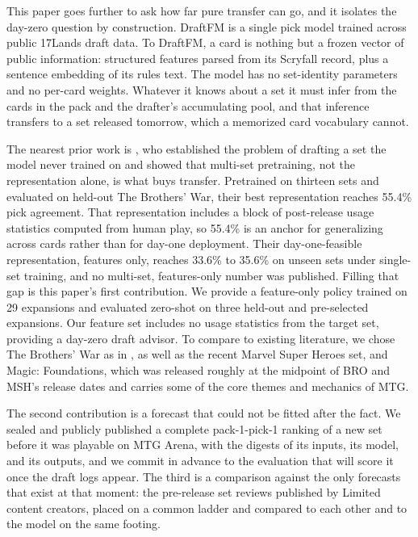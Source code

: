 \documentclass[11pt]{article}
\numberwithin{equation}{section}
\begin{document}
This paper goes further to ask how far pure transfer can go, and it isolates the day-zero
question by construction. DraftFM is a single pick model trained across public
17Lands draft data. To DraftFM, a card is nothing but a frozen vector of public
information: structured features parsed from its Scryfall record, plus a sentence
embedding of its rules text. The model has no set-identity parameters and no
per-card weights. Whatever it knows about a set it must infer from the cards in
the pack and the drafter's accumulating pool, and that inference transfers to a
set released tomorrow, which a memorized card vocabulary cannot.

The nearest prior work is \citet{bertram2024a}, who established the problem of
drafting a set the model never trained on and showed that multi-set pretraining,
not the representation alone, is what buys transfer. Pretrained on thirteen sets
and evaluated on held-out The Brothers' War, their best representation reaches
55.4\% pick agreement. That representation includes a block of post-release
usage statistics computed from human play, so 55.4\% is an anchor for
generalizing across cards rather than for day-one deployment. Their
day-one-feasible representation, features only, reaches 33.6\% to 35.6\% on unseen
sets under single-set training, and no multi-set, features-only number was
published. Filling that gap is this paper's first contribution. We provide
a feature-only policy trained on 29 expansions and evaluated zero-shot on three
held-out and pre-selected expansions. Our feature set includes no usage statistics
from the target set, providing a day-zero draft advisor. To compare to existing
literature, we chose The Brothers' War as in \citet{bertram2024a}, as well as
the recent Marvel Super Heroes set, and Magic: Foundations, which was released
roughly at the midpoint of BRO and MSH's release dates and carries some of the
core themes and mechanics of MTG.

The second contribution is a forecast that could not be fitted after the fact. We
sealed and publicly published a complete pack-1-pick-1 ranking of a new set
before it was playable on MTG Arena, with the digests of its inputs, its model,
and its outputs, and we commit in advance to the evaluation that will score it
once the draft logs appear. The third is a comparison against the only forecasts
that exist at that moment: the pre-release set reviews published by Limited
content creators, placed on a common ladder and compared to each other and to the
model on the same footing.
\end{document}
